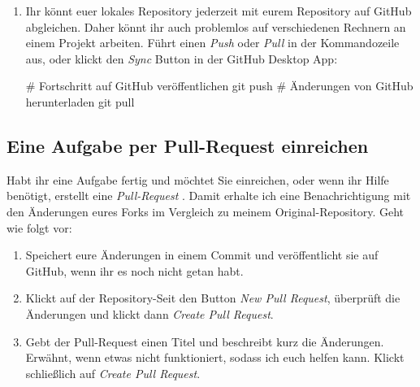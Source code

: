 \documentclass[parskip=half, final]{scrreprt}
\begin{document}
\begin{enumerate}
\item Ihr könnt euer lokales Repository jederzeit mit eurem Repository auf GitHub abgleichen. Daher könnt ihr auch problemlos auf verschiedenen Rechnern an einem Projekt arbeiten. Führt einen \emph{Push}  oder \emph{Pull}  in der Kommandozeile aus, oder klickt den \emph{Sync} Button in der GitHub Desktop App:
\begin{shcode}
# Fortschritt auf GitHub veröffentlichen
git push
# Änderungen von GitHub herunterladen
git pull
\end{shcode}

\end{enumerate}


\subsection{Eine Aufgabe per Pull-Request einreichen}\label{pull_request}

Habt ihr eine Aufgabe fertig und möchtet Sie einreichen, oder wenn ihr Hilfe benötigt, erstellt eine \emph{Pull-Request} . Damit erhalte ich eine Benachrichtigung mit den Änderungen eures Forks im Vergleich zu meinem Original-Repository. Geht wie folgt vor:

\begin{enumerate}

\item Speichert eure Änderungen in einem Commit und veröffentlicht sie auf GitHub, wenn ihr es noch nicht getan habt.

\item Klickt auf der Repository-Seit den Button \emph{New Pull Request}, überprüft die Änderungen und klickt dann \emph{Create Pull Request}.

\item Gebt der Pull-Request einen Titel und beschreibt kurz die Änderungen. Erwähnt, wenn etwas nicht funktioniert, sodass ich euch helfen kann. Klickt schließlich auf \emph{Create Pull Request}.

\end{enumerate}
\end{document}
